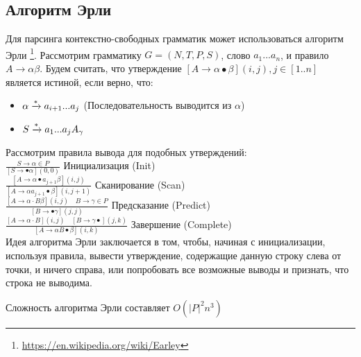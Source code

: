 \subsection{Алгоритм Эрли}
Для парсинга контекстно-свободных грамматик может использоваться алгоритм Эрли\cite{Earley} \footnote{\url{https://en.wikipedia.org/wiki/Earley}}.
Рассмотрим грамматику $G=(N,T,P,S)$, слово $a_1...a_n$,
и правило $A \rightarrow \alpha\beta$. Будем считать, что утверждение
$[A\rightarrow \alpha \bullet \beta](i,j), j \in [1..n]$ является истиной, если верно, что:
\begin{itemize}
	\item $\alpha \xrightarrow{\smash{*}} a_{i+1}...a_j$ (Последовательность выводится из $\alpha$)
	\item $S \xrightarrow{\smash{*}} a_1...a_jA_\gamma$ 
\end{itemize}


Рассмотрим правила вывода для подобных утверждений:\\

$\frac{S \rightarrow \alpha \in P}{[S \rightarrow \bullet \alpha](0,0)}$ Инициализация (Init)\\

$\frac{\left[A \rightarrow \alpha \bullet a_{j+1} \beta\right](i, j)}{\left[A \rightarrow \alpha a_{j+1} \bullet \beta\right](i, j+1)}$ Сканирование (Scan)\\

$\frac{[A \rightarrow \alpha \cdot B \beta](i, j) \quad B \rightarrow \gamma \in P}{[B \rightarrow \bullet \gamma](j, j)}$ Предсказание (Predict)\\

$\frac{[A \rightarrow \alpha \cdot B](i, j) \quad[B \rightarrow \gamma \bullet](j, k)}{[A \rightarrow \alpha B \bullet \beta](i, k)}$ Завершение (Complete)\\

Идея алгоритма Эрли заключается в том, чтобы, начиная с инициализации, используя правила, вывести утверждение, содержащие данную строку слева от точки, и ничего справа, или попробовать все возможные выводы и признать, что строка не выводима.

Сложность алгоритма Эрли составляет $O(|P|^2n^3)$

